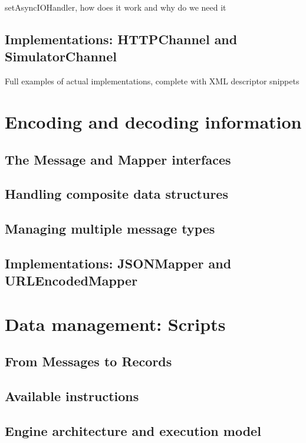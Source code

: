 setAsyncIOHandler, how does it work and why do we need it

\subsection{Implementations: HTTPChannel and SimulatorChannel}

Full examples of actual implementations, complete with XML descriptor snippets


\section{Encoding and decoding information}

\subsection{The Message and Mapper interfaces}

\subsection{Handling composite data structures}

\subsection{Managing multiple message types}

\subsection{Implementations: JSONMapper and URLEncodedMapper}


\section{Data management: Scripts}

\subsection{From Messages to Records}

\subsection{Available instructions}

\subsection{Engine architecture and execution model}

